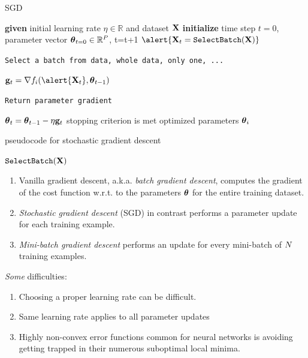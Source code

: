 \documentclass[xcolor=pdftex,dvipsnames,table,mathserif]{beamer}
\begin{document}
\begin{frame}{SGD \cite{robbins1985stochastic}}
\begin{algorithm}[H]
\begin{algorithmic}[1]
\STATE \textbf{given} initial learning rate $\eta \in \mathbb{R}$ and dataset $\mathbf{X}$
\STATE \textbf{initialize} time step $t=0$, parameter vector $\boldsymbol{\theta}_{t=0} \in \mathbb{R}^P$,
\REPEAT
\STATE t=t+1
\STATE $\alert{\X_t=\texttt{SelectBatch} (\X)}$ \begin{tiny}\texttt{Select a batch from data, whole data, only one, ... } \end{tiny}
\STATE $\mathbf{g}_t = \nabla f_i(\alert{\X_t},\param_{t-1})$  \begin{tiny}\texttt{Return parameter gradient}\end{tiny}
\STATE $\boldsymbol{\theta}_t=\boldsymbol{\theta}_{t-1}  - \eta \mathbf{g}_t$
\UNTIL stopping criterion is met
\RETURN optimized parameters $\boldsymbol{\theta}_i$
\end{algorithmic}
\caption{pseudocode for stochastic gradient descent }
\label{alg:seq}
\end{algorithm}
\end{frame}


\begin{frame}{$\texttt{SelectBatch} (\mathbf{X})$}
\begin{enumerate}
\item Vanilla gradient descent, a.k.a. \emph{batch gradient descent}, computes the gradient of the cost function w.r.t. to the parameters $\boldsymbol{\theta}$
for the entire training dataset.
\item \emph{Stochastic gradient descent} (SGD) in contrast performs a parameter update for each training example. 
\item \emph{Mini-batch gradient descent} performs an update for every mini-batch of $N$ training examples.
\end{enumerate}
\textit{Some} difficulties:
\begin{enumerate}
\item Choosing a proper learning rate can be difficult.
\item Same learning rate applies to all parameter updates
\item Highly non-convex error functions common for neural networks is avoiding getting trapped in their numerous suboptimal local minima.
\end{enumerate}
\end{frame}
\end{document}
